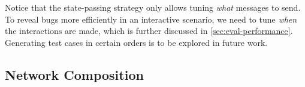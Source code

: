 
Notice that the state-passing strategy only allows tuning {\em what} messages to
send.  To reveal bugs more efficiently in an interactive scenario, we need to
tune {\em when} the interactions are made, which is further discussed in
\autoref{sec:eval-performance}.  Generating test cases in certain orders is to
be explored in future work.

\pagebreak
\subsection{Network Composition}
\label{sec:net-compose}

